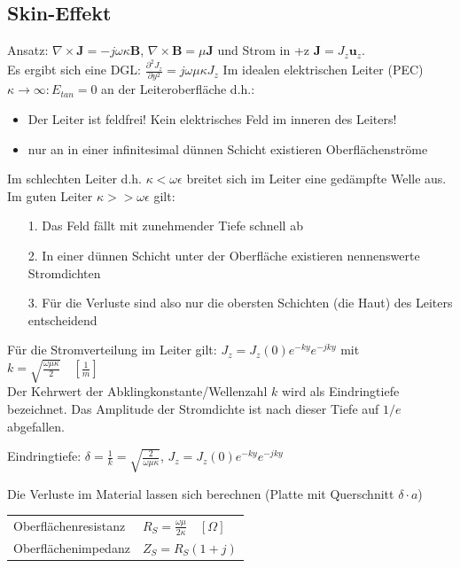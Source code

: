 \documentclass[english]{latex4ei/latex4ei_sheet}
\begin{document}
\begin{sectionbox}
\subsection{Skin-Effekt}
Ansatz: $\nabla \times \mathbf{J} = -j\omega\kappa \mathbf{B}$, $\nabla\times\mathbf{B} = \mu \mathbf{J}$ und Strom in +z $\mathbf{J} = J_z \mathbf{u}_z$.\\
Es ergibt sich eine DGL: $\frac{\partial^2 J_z}{\partial y^2} = j\omega \mu \kappa J_z$
Im idealen elektrischen Leiter (PEC) $\kappa \to \infty: E_{tan} = 0$ an der Leiteroberfläche d.h.:\\
\begin{itemize}
	\item Der Leiter ist feldfrei! Kein elektrisches Feld im inneren des Leiters!
	\item nur an in einer infinitesimal dünnen Schicht existieren Oberflächenströme
\end{itemize}
Im schlechten Leiter d.h. $\kappa < \omega\epsilon$ breitet sich im Leiter eine gedämpfte Welle aus.\\
Im guten Leiter $\kappa >> \omega\epsilon$ gilt:
\begin{itemize}
	\item[1.] Das Feld fällt mit zunehmender Tiefe schnell ab
	\item[2.] In einer dünnen Schicht unter der Oberfläche existieren nennenswerte Stromdichten
	\item[3.] Für die Verluste sind also nur die obersten Schichten (die Haut) des Leiters entscheidend
\end{itemize}
Für die Stromverteilung im Leiter gilt: $J_z = J_z(0) e^{-ky} e^{-jky}$ mit $k = \sqrt{\frac{\omega\mu\kappa}{2}}\quad[\frac{1}{m}]$\\
Der Kehrwert der Abklingkonstante/Wellenzahl $k$ wird als Eindringtiefe bezeichnet. Das Amplitude der Stromdichte ist nach dieser Tiefe auf $1/e$ abgefallen.
\begin{emphbox}
Eindringtiefe: $\delta = \frac{1}{k} = \sqrt{\frac{2}{\omega \mu \kappa}}$, $J_z = J_z(0) e^{-ky} e^{-jky}$
\end{emphbox}
Die Verluste im Material lassen sich berechnen (Platte mit Querschnitt $\delta \cdot a$)\\
\begin{tabular*}{\columnwidth}{ll}
	Oberflächenresistanz & $R_S = \frac{\omega\mu}{2\kappa} \quad [\Omega]$ \\
	Oberflächenimpedanz & $Z_S = R_S(1+j)$ \\

\end{tabular*}
\end{sectionbox}
\end{document}
